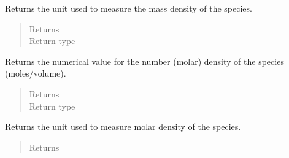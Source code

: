 \documentclass[letterpaper,10pt,openany,oneside,english]{sphinxmanual}
\begin{document}
\begin{fulllineitems}
\begin{fulllineitems}
\label{\detokenize{support_rst/specie:specie.Specie.GetMassCCUnit}}
Returns the unit used to measure the mass density of the species.
\begin{quote}\begin{description}
\item[{Returns}] \leavevmode
{}

\item[{Return type}] \leavevmode
{}

\end{description}\end{quote}

\end{fulllineitems}


\begin{fulllineitems}
\label{\detokenize{support_rst/specie:specie.Specie.GetMolarCC}}
Returns the numerical value for the number (molar) density of the
species (moles/volume).
\begin{quote}\begin{description}
\item[{Returns}] \leavevmode
{}

\item[{Return type}] \leavevmode
{}

\end{description}\end{quote}

\end{fulllineitems}


\begin{fulllineitems}
\label{\detokenize{support_rst/specie:specie.Specie.GetMolarCCUnit}}
Returns the unit used to measure molar density of the species.
\begin{quote}\begin{description}
\item[{Returns}] \leavevmode
{}


\end{description}
\end{quote}
\end{fulllineitems}
\end{fulllineitems}
\end{document}
